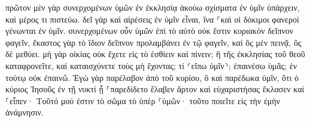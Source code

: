 \documentclass{openreader}
\begin{document}
πρῶτον μὲν γὰρ συνερχομένων ὑμῶν ἐν ἐκκλησίᾳ ἀκούω σχίσματα ἐν ὑμῖν ὑπάρχειν, καὶ μέρος τι πιστεύω. 
δεῖ γὰρ καὶ αἱρέσεις ἐν ὑμῖν εἶναι, ἵνα ⸀καὶ οἱ δόκιμοι φανεροὶ γένωνται ἐν ὑμῖν. 
συνερχομένων οὖν ὑμῶν ἐπὶ τὸ αὐτὸ οὐκ ἔστιν κυριακὸν δεῖπνον φαγεῖν, 
ἕκαστος γὰρ τὸ ἴδιον δεῖπνον προλαμβάνει ἐν τῷ φαγεῖν, καὶ ὃς μὲν πεινᾷ, ὃς δὲ μεθύει. 
μὴ γὰρ οἰκίας οὐκ ἔχετε εἰς τὸ ἐσθίειν καὶ πίνειν; ἢ τῆς ἐκκλησίας τοῦ θεοῦ καταφρονεῖτε, καὶ καταισχύνετε τοὺς μὴ ἔχοντας; τί ⸂εἴπω ὑμῖν⸃; ἐπαινέσω ὑμᾶς; ἐν τούτῳ οὐκ ἐπαινῶ. 
Ἐγὼ γὰρ παρέλαβον ἀπὸ τοῦ κυρίου, ὃ καὶ παρέδωκα ὑμῖν, ὅτι ὁ κύριος Ἰησοῦς ἐν τῇ νυκτὶ ᾗ ⸀παρεδίδετο ἔλαβεν ἄρτον 
καὶ εὐχαριστήσας ἔκλασεν καὶ ⸀εἶπεν· Τοῦτό μού ἐστιν τὸ σῶμα τὸ ὑπὲρ ⸀ὑμῶν· τοῦτο ποιεῖτε εἰς τὴν ἐμὴν ἀνάμνησιν. 
\end{document}
